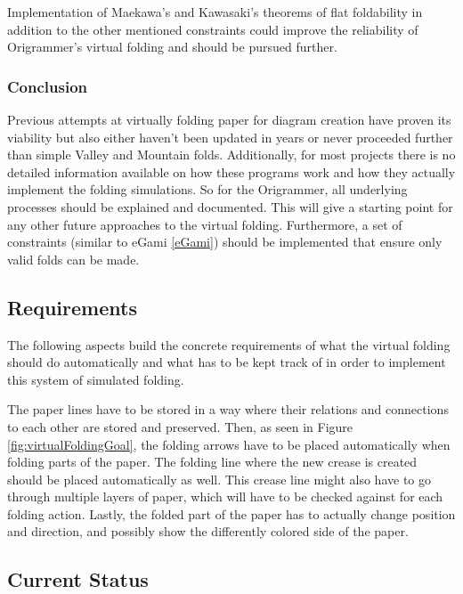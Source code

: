 \noindent Implementation of Maekawa's and Kawasaki's theorems of flat foldability\cite{hull1994mathematics} in addition to the other mentioned constraints could improve the reliability of Origrammer's virtual folding and should be pursued further.

\subsubsection{Conclusion}

\noindent Previous attempts at virtually folding paper for diagram creation have proven its viability but also either haven't been updated in years or never proceeded further than simple Valley and Mountain folds. Additionally, for most projects there is no detailed information available on how these programs work and how they actually implement the folding simulations. So for the Origrammer, all underlying processes should be explained and documented. This will give a starting point for any other future approaches to the virtual folding. Furthermore, a set of constraints (similar to eGami \ref{eGami}) should be implemented that ensure only valid folds can be made.

\newpage
\subsection{Requirements}

The following aspects build the concrete requirements of what the virtual folding should do automatically and what has to be kept track of in order to implement this system of simulated folding.

The paper lines have to be stored in a way where their relations and connections to each other are stored and preserved. Then, as seen in Figure \ref{fig:virtualFoldingGoal}, the folding arrows have to be placed automatically when folding parts of the paper. The folding line where the new crease is created should be placed automatically as well. This crease line might also have to go through multiple layers of paper, which will have to be checked against for each folding action. Lastly, the folded part of the paper has to actually change position and direction, and possibly show the differently colored side of the paper.

\subsection{Current Status}

